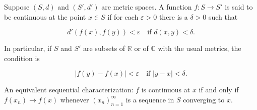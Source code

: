 Suppose $(S, d)$ and $(S', d')$ are metric spaces. A function $f: S \to S'$ is said to be continuous at the point $x \in S$ if for each $\varepsilon > 0$ there is a $\delta > 0$ such that

$$d'(f(x), f(y)) < \varepsilon \quad \text{if } d(x, y) < \delta.$$

In particular, if $S$ and $S'$ are subsets of $\mathbb{R}$ or of $\mathbb{C}$ with the usual metrics, the condition is

$$|f(y) - f(x)| < \varepsilon \quad \text{if } |y - x| < \delta.$$

An equivalent sequential characterization: $f$ is continuous at $x$ if and only if $f(x_n) \to f(x)$ whenever $(x_n)_{n=1}^{\infty}$ is a sequence in $S$ converging to $x$.
